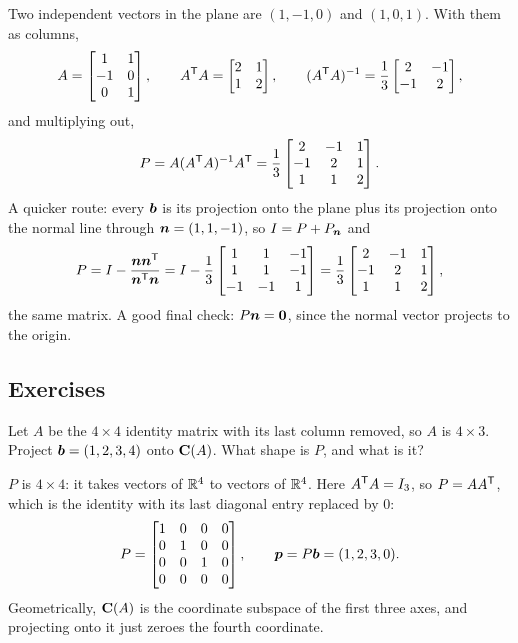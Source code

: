 \begin{example}[Projection onto the plane \texorpdfstring{$x+y-z=0$}{x+y-z=0}]\label{ex:u17-normal}
Two independent vectors in the plane are $(1,-1,0)$ and $(1,0,1)$. With them as columns,
\[
  A=\begin{bmatrix}1&1\\-1&0\\0&1\end{bmatrix},\qquad
  A^{\mathsf{T}} A=\begin{bmatrix}2&1\\1&2\end{bmatrix},\qquad
  (A^{\mathsf{T}} A)^{-1}=\frac13\begin{bmatrix}2&-1\\-1&2\end{bmatrix},
\]
and multiplying out,
\[
  P=A(A^{\mathsf{T}} A)^{-1}A^{\mathsf{T}}=\frac13\begin{bmatrix}2&-1&1\\-1&2&1\\1&1&2\end{bmatrix}.
\]
A quicker route: every $\boldsymbol{b}$ is its projection onto the plane plus its projection onto the
normal line through $\boldsymbol{n}=(1,1,-1)$, so $I=P+P_{\boldsymbol{n}}$ and
\[
  P=I-\frac{\boldsymbol{n}\boldsymbol{n}^{\mathsf{T}}}{\boldsymbol{n}^{\mathsf{T}}\boldsymbol{n}}
   =I-\frac13\begin{bmatrix}1&1&-1\\1&1&-1\\-1&-1&1\end{bmatrix}
   =\frac13\begin{bmatrix}2&-1&1\\-1&2&1\\1&1&2\end{bmatrix},
\]
the same matrix. A good final check: $P\boldsymbol{n}=\boldsymbol{0}$, since the normal vector projects to
the origin.
\end{example}

\subsection{Exercises}

\begin{exercise}\label{ex:u17-drop}
Let $A$ be the $4\times 4$ identity matrix with its last column removed, so $A$ is
$4\times 3$. Project $\boldsymbol{b}=(1,2,3,4)$ onto $\mathbf{C}(A)$. What shape is $P$, and what is it?
\end{exercise}

\begin{solution}
$P$ is $4\times 4$: it takes vectors of $\mathbb{R}^4$ to vectors of $\mathbb{R}^4$. Here $A^{\mathsf{T}} A=I_3$, so
$P=AA^{\mathsf{T}}$, which is the identity with its last diagonal entry replaced by $0$:
\[
  P=\begin{bmatrix}1&0&0&0\\0&1&0&0\\0&0&1&0\\0&0&0&0\end{bmatrix},\qquad
  \boldsymbol{p}=P\boldsymbol{b}=(1,2,3,0).
\]
Geometrically, $\mathbf{C}(A)$ is the coordinate subspace of the first three axes, and projecting
onto it just zeroes the fourth coordinate.
\end{solution}

